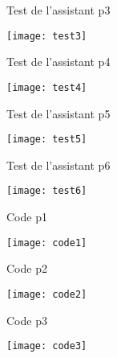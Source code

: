 \documentclass{beamer}
\begin{document}
\begin{frame}{Test de l'assistant p3}
    \begin{minipage}{0.95\textwidth}
        \centering
        \texttt{[image: test3]}
    \end{minipage} 
    
\end{frame}

\begin{frame}{Test de l'assistant p4}
    \begin{minipage}{0.95\textwidth}
        \centering
        \texttt{[image: test4]}
    \end{minipage} 
    
\end{frame}

\begin{frame}{Test de l'assistant p5}
    \begin{minipage}{0.95\textwidth}
        \centering
        \texttt{[image: test5]}
    \end{minipage} 
    
\end{frame}

\begin{frame}{Test de l'assistant p6}
    \begin{minipage}{0.95\textwidth}
        \centering
        \texttt{[image: test6]}
    \end{minipage} 
    
\end{frame}


\begin{frame}{Code p1}
    \begin{minipage}{0.95\textwidth}
        \centering
        \texttt{[image: code1]}
    \end{minipage} 
    
\end{frame}

\begin{frame}{Code p2}
    \begin{minipage}{0.95\textwidth}
        \centering
        \texttt{[image: code2]}
    \end{minipage} 
    
\end{frame}

\begin{frame}{Code p3}
    \begin{minipage}{0.95\textwidth}
        \centering
        \texttt{[image: code3]}
    \end{minipage} 
    
\end{frame}
\end{document}
